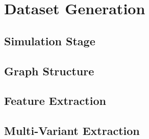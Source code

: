 \section{Dataset Generation}

\subsection{Simulation Stage}

\subsection{Graph Structure}

\subsection{Feature Extraction}

\subsection{Multi-Variant Extraction}
